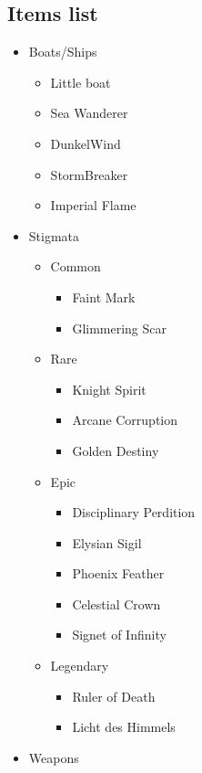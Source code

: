 \documentclass{article}
\begin{document}
\subsection*{Items list}
\begin{itemize}
    \item Boats/Ships
    \begin{itemize}
        \item Little boat
        \item Sea Wanderer
        \item DunkelWind
        \item StormBreaker
        \item Imperial Flame
    \end{itemize}
    \item Stigmata
    \begin{itemize}
        \item Common
        \begin{itemize}
            \item Faint Mark
            \item Glimmering Scar
        \end{itemize}
        \item Rare
        \begin{itemize}
            \item Knight Spirit
            \item Arcane Corruption
            \item Golden Destiny
        \end{itemize}
        \item Epic
        \begin{itemize}
            \item Disciplinary Perdition
            \item Elysian Sigil
            \item Phoenix Feather
            \item Celestial Crown
            \item Signet of Infinity
        \end{itemize}
        \item Legendary
        \begin{itemize}
            \item Ruler of Death
            \item Licht des Himmels
        \end{itemize}
    \end{itemize}
    \item Weapons

\end{itemize}
\end{document}
